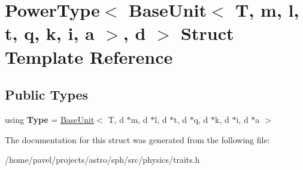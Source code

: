 \hypertarget{structPowerType_3_01BaseUnit_3_01T_00_01m_00_01l_00_01t_00_01q_00_01k_00_01i_00_01a_01_4_00_01d_01_4}{}\section{Power\+Type$<$ Base\+Unit$<$ T, m, l, t, q, k, i, a $>$, d $>$ Struct Template Reference}
\label{structPowerType_3_01BaseUnit_3_01T_00_01m_00_01l_00_01t_00_01q_00_01k_00_01i_00_01a_01_4_00_01d_01_4}
\subsection*{Public Types}
\begin{DoxyCompactItemize}
\item 
\hypertarget{structPowerType_3_01BaseUnit_3_01T_00_01m_00_01l_00_01t_00_01q_00_01k_00_01i_00_01a_01_4_00_01d_01_4_a5c1469c2d2474c8083bca7571b85c96b}{}\label{structPowerType_3_01BaseUnit_3_01T_00_01m_00_01l_00_01t_00_01q_00_01k_00_01i_00_01a_01_4_00_01d_01_4_a5c1469c2d2474c8083bca7571b85c96b} 
using {\bfseries Type} = \hyperlink{classBaseUnit}{Base\+Unit}$<$ T, d $\ast$m, d $\ast$l, d $\ast$t, d $\ast$q, d $\ast$k, d $\ast$i, d $\ast$a $>$
\end{DoxyCompactItemize}


The documentation for this struct was generated from the following file\+:\begin{DoxyCompactItemize}
\item 
/home/pavel/projects/astro/sph/src/physics/traits.\+h\end{DoxyCompactItemize}
